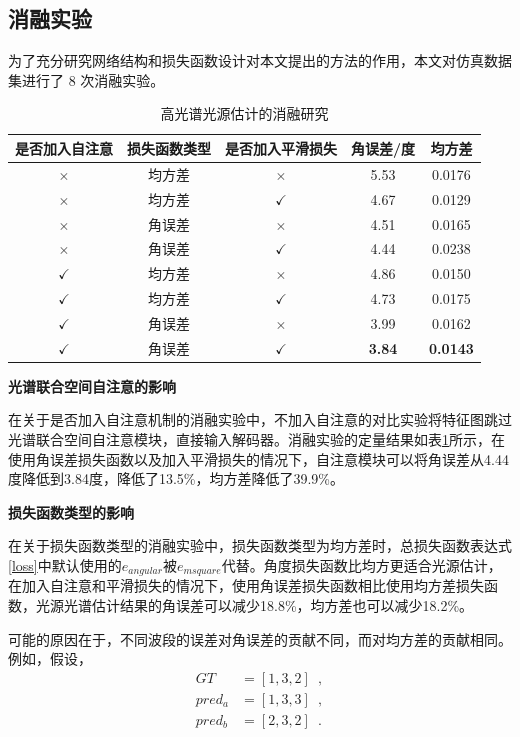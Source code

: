 \documentclass[
    type = master, %
    degree = academic,        %
    decl-page,  %
  ]{njuthesis}
\begin{document}
\subsection{消融实验 }


为了充分研究网络结构和损失函数设计对本文提出的方法的作用，本文对仿真数据集进行了 8 次消融实验。 

\begin{table}[h]

\centering
\caption{高光谱光源估计的消融研究}
\label{tab:ab}
\begin{tabular}{ccccc}
\hline
是否加入自注意&损失函数类型&是否加入平滑损失&角误差/度&均方差\\
\hline
$\times$ &均方差&$\times$ &5.53&  0.0176 \\
$\times$ &均方差&$\checkmark$ &4.67&  0.0129 \\
$\times$ &角误差&$\times$ &4.51&  0.0165 \\
$\times$ &角误差&$\checkmark$ &4.44&  0.0238 \\
$\checkmark$ &均方差&$\times$&4.86  &0.0150  \\
$\checkmark$ &均方差&$\checkmark$&4.73  &0.0175  \\
$\checkmark$ &角误差&$\times$& 3.99 &0.0162 \\
$\checkmark$ &角误差&$\checkmark$& \textbf{3.84} &\textbf{0.0143} \\
\hline
\end{tabular}
\end{table}

\textbf{光谱联合空间自注意的影响}

在关于是否加入自注意机制的消融实验中，不加入自注意的对比实验将特征图跳过光谱联合空间自注意模块，直接输入解码器。消融实验的定量结果如表\ref{tab:ab}所示，在使用角误差损失函数以及加入平滑损失的情况下，自注意模块可以将角误差从4.44度降低到3.84度，降低了13.5\%，均方差降低了39.9\%。

\textbf{损失函数类型的影响}

在关于损失函数类型的消融实验中，损失函数类型为均方差时，总损失函数表达式\ref{loss}中默认使用的${e_{angular}}$被${e_{msquare}}$代替。角度损失函数比均方更适合光源估计，在加入自注意和平滑损失的情况下，使用角误差损失函数相比使用均方差损失函数，光源光谱估计结果的角误差可以减少18.8\%，均方差也可以减少18.2\%。 

可能的原因在于，不同波段的误差对角误差的贡献不同，而对均方差的贡献相同。 例如，假设，
\begin{align*}
GT &= [1,3,2]\enspace, \\
pred_{a} &= [1,3,3]\enspace, \\
pred_{b} &= [2,3,2]\enspace.
\end{align*}
\end{document}
